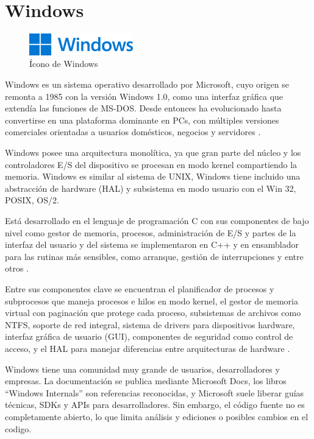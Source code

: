 \section{Windows}

\begin{figure}[H]
    \centering
    \includegraphics[width=0.4\textwidth]{figures/logoWindows.png}
    \caption[Ícono de Windows]
            {Ícono de Windows \citep{windowslogo2021}}
    \label{fig:windows}
\end{figure}

Windows es un sistema operativo desarrollado por Microsoft, cuyo origen se remonta a 1985 con la versión Windows 1.0, como una interfaz gráfica que extendía las funciones de MS-DOS. Desde entonces ha evolucionado hasta convertirse en una plataforma dominante en PCs, con múltiples versiones comerciales orientadas a usuarios domésticos, negocios y servidores \citep{Natividad2023}.

Windows posee una arquitectura monolítica, ya que gran parte del núcleo y los controladores E/S del dispositivo se procesan  en modo kernel compartiendo la memoria. Windows es similar al sistema de UNIX, Windows tiene incluido una abstracción de hardware (HAL) y subsistema en modo usuario con el Win 32, POSIX, OS/2. \citep{ Russinovich2005}

Está desarrollado en el lenguaje de programación C con sus componentes de bajo nivel como gestor de memoria, procesos, administración de E/S y partes de la interfaz del usuario y del sistema se implementaron en C++ y en ensamblador para las rutinas más sensibles, como arranque, gestión de interrupciones y entre otros \citep{ Russinovich2005}.

Entre sus componentes clave se encuentran el planificador de procesos y subprocesos que maneja procesos e hilos en modo kernel, el gestor de memoria virtual con paginación que protege cada proceso, subsistemas de archivos como NTFS, soporte de red integral, sistema de drivers para dispositivos hardware, interfaz gráfica de usuario (GUI), componentes de seguridad como control de acceso, y el HAL para manejar diferencias entre arquitecturas de hardware \citep{Forrester2000}.

Windows tiene una comunidad muy grande de usuarios, desarrolladores y empresas. La documentación se publica mediante Microsoft Docs, los libros “Windows Internals” son referencias reconocidas, y Microsoft suele liberar guías técnicas, SDKs y APIs para desarrolladores. Sin embargo, el código fuente no es completamente abierto, lo que limita análisis y ediciones o posibles cambios en el codigo.